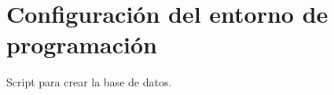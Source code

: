 \documentclass[\main/main.tex]{subfiles}
\begin{document}
\chapter{Configuración del entorno de programación}
\label{cha:a01_instalacion}
%
%

	Script para crear la base de datos.
\end{document}
